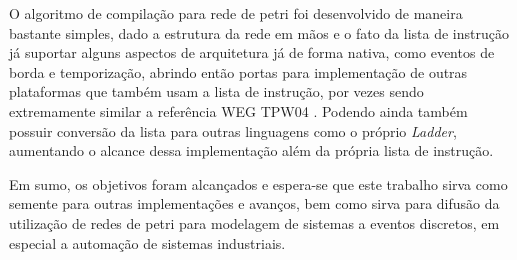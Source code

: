 O algoritmo de compilação para rede de petri foi desenvolvido de maneira bastante simples, dado a estrutura da rede em mãos e o fato da lista de instrução já suportar alguns aspectos de arquitetura já de forma nativa, como eventos de borda e temporização, abrindo então portas para implementação de outras plataformas que também usam a lista de instrução, por vezes sendo extremamente similar a referência WEG TPW04 \cite{wegtpw04}. Podendo ainda também possuir conversão da lista para outras linguagens como o próprio \textit{Ladder}, aumentando o alcance dessa implementação além da própria lista de instrução.

Em sumo, os objetivos foram alcançados e espera-se que este trabalho sirva como semente para outras implementações e avanços, bem como sirva para difusão da utilização de redes de petri para modelagem de sistemas a eventos discretos, em especial a automação de sistemas industriais.